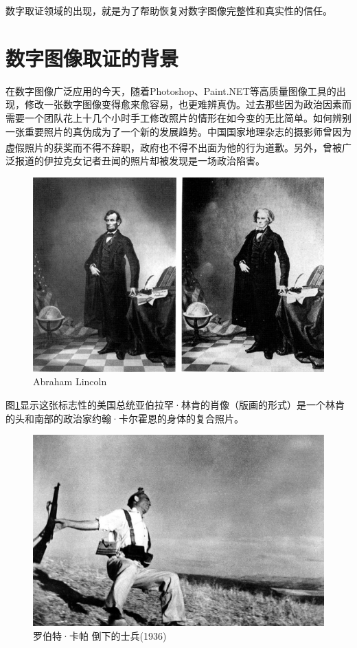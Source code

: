 \documentclass[a4paper, 10pt, notitlepage]{report}
\newcommand{\supercite}[1]{\textsuperscript{\cite{#1}}}
\begin{document}
	数字取证领域的出现，就是为了帮助恢复对数字图像完整性和真实性的信任。
	
	\section{数字图像取证的背景}
		在数字图像广泛应用的今天，随着Photoshop、Paint.NET等高质量图像工具的出现，修改一张数字图像变得愈来愈容易，也更难辨真伪。过去那些因为政治因素而需要一个团队花上十几个小时手工修改照片的情形在如今变的无比简单。如何辨别一张重要照片的真伪成为了一个新的发展趋势。中国国家地理杂志的摄影师曾因为虚假照片的获奖而不得不辞职\supercite{sa02}，政府也不得不出面为他的行为道歉。另外，曾被广泛报道的伊拉克女记者丑闻的照片却被发现是一场政治陷害。

		\begin{figure}[ht]
			\centering
			\includegraphics[width=5in]{img/c1860-Lincoln.jpeg}
			\caption{Abraham Lincoln}
			\label{fig-lincoln}
		\end{figure}

		图\ref{fig-lincoln}显示这张标志性的美国总统亚伯拉罕·林肯的肖像（版画的形式）是一个林肯的头和南部的政治家约翰·卡尔霍恩的身体的复合照片。

		\begin{figure}[ht]
			\centering
			\includegraphics[width=5in]{img/capa_thefallingsoldier.jpeg}
			\caption{罗伯特·卡帕 倒下的士兵(1936)}
			\label{fig-capa}
		\end{figure}
\end{document}
